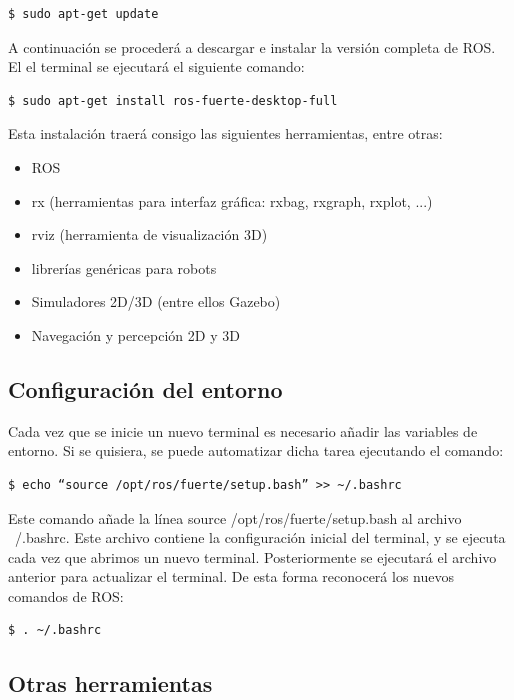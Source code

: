 \documentclass[10pt,a4paper]{report}
\begin{document}
\begin{verbatim}
$ sudo apt-get update
\end{verbatim}

A continuación se procederá a descargar e instalar la versión completa de ROS. El el terminal se ejecutará el siguiente comando:

\begin{verbatim}
$ sudo apt-get install ros-fuerte-desktop-full
\end{verbatim}

Esta instalación traerá consigo las siguientes herramientas, entre otras:

\begin{itemize}
\item ROS
\item rx (herramientas para interfaz gráfica: rxbag,  rxgraph, rxplot, ...)
\item rviz (herramienta de visualización 3D)
\item librerías genéricas para robots
\item Simuladores 2D/3D (entre ellos Gazebo)
\item Navegación y percepción 2D y 3D
\end{itemize}

\subsection{Configuración del entorno}

Cada vez que se inicie un nuevo terminal es necesario añadir las variables de entorno. Si se quisiera, se puede automatizar dicha tarea ejecutando el comando:

\begin{verbatim}
$ echo “source /opt/ros/fuerte/setup.bash” >> ~/.bashrc
\end{verbatim}

Este comando añade la línea  source /opt/ros/fuerte/setup.bash al archivo ~/.bashrc. Este archivo contiene la configuración inicial del terminal, y se ejecuta cada vez que abrimos un nuevo terminal. Posteriormente se ejecutará el archivo anterior para actualizar el terminal. De esta forma reconocerá los nuevos comandos de ROS:

\begin{verbatim}
$ . ~/.bashrc
\end{verbatim}

\subsection{Otras herramientas}
\end{document}
